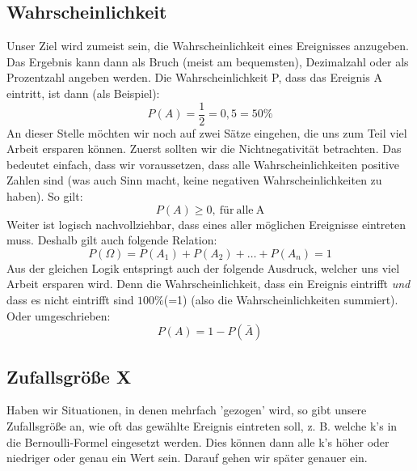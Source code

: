 \subsection{Wahrscheinlichkeit}
Unser Ziel wird zumeist sein, die Wahrscheinlichkeit eines Ereignisses anzugeben. Das Ergebnis kann dann als Bruch (meist am bequemsten), Dezimalzahl oder als Prozentzahl angeben werden. Die Wahrscheinlichkeit P, dass das Ereignis A eintritt, ist dann (als Beispiel):
\[P(A)=\frac{1}{2}=0,5=50\%\]
An dieser Stelle möchten wir noch auf zwei Sätze eingehen, die uns zum Teil viel Arbeit ersparen können. Zuerst sollten wir die Nichtnegativität betrachten. Das bedeutet einfach, dass wir voraussetzen, dass alle Wahrscheinlichkeiten positive Zahlen sind (was auch Sinn macht, keine negativen Wahrscheinlichkeiten zu haben). So gilt:
\[P(A)\geq 0 \mathrm{,\ für\ alle\ A}\]
Weiter ist logisch nachvollziehbar, dass eines aller möglichen Ereignisse eintreten muss. Deshalb gilt auch folgende Relation:
\[P(\Omega)=P(A_1)+P(A_2)+ \ldots+ P(A_n)=1\]
Aus der gleichen Logik entspringt auch der folgende Ausdruck, welcher uns viel Arbeit ersparen wird. Denn die Wahrscheinlichkeit, dass ein Ereignis eintrifft \emph{und} dass es nicht eintrifft sind \(100\%\)(=1) (also die Wahrscheinlichkeiten summiert). Oder umgeschrieben:
\[P(A)=1-P(\bar{A})\]

\subsection{Zufallsgröße X}
Haben wir Situationen, in denen mehrfach 'gezogen' wird, so gibt unsere Zufallsgröße an, wie oft das gewählte Ereignis eintreten soll, z. B. welche k's in die Bernoulli-Formel eingesetzt werden. Dies können dann alle k's höher oder niedriger oder genau ein Wert sein. Darauf gehen wir später genauer ein.

